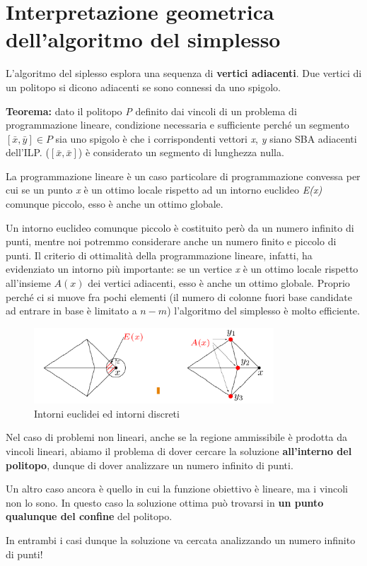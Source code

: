\documentclass[11pt]{book}
\begin{document}
\section{Interpretazione geometrica dell'algoritmo del simplesso}

L'algoritmo del siplesso esplora una sequenza di {\bf vertici
  adiacenti}. Due vertici di un politopo si dicono adiacenti se sono
connessi da uno spigolo.

{\bf Teorema:} dato il politopo {\em P} definito dai vincoli di un
problema di programmazione lineare, condizione necessaria e
sufficiente perch\'e un segmento $[\bar{x},\bar{y}] \in P$ sia uno
spigolo \`e che i corrispondenti vettori {\em x}, {\em y} siano SBA
adiacenti dell'ILP. ($[\bar{x},\bar{x}]$) \`e considerato un segmento
di lunghezza nulla.

La programmazione lineare \`e un caso particolare di programmazione
convessa per cui se un punto {\em x} \`e un ottimo locale rispetto ad
un intorno euclideo {\em E(x)} comunque piccolo, esso \`e anche un
ottimo globale.

Un intorno euclideo comunque piccolo \`e costituito per\`o da un
numero infinito di punti, mentre noi potremmo considerare anche un
numero finito e piccolo di punti. Il criterio di ottimalit\`a della
programmazione lineare, infatti, ha evidenziato un intorno pi\`u
importante: se un vertice {\em x} \`e un ottimo locale rispetto
all'insieme $A(x)$ dei vertici adiacenti, esso \`e anche un ottimo
globale. Proprio perch\'e ci si muove fra pochi elementi (il numero di
colonne fuori base candidate ad entrare in base \`e limitato a $n-m$)
l'algoritmo del simplesso \`e molto efficiente.

\begin{figure}[h!]
  \centering
  \includegraphics[width=0.8\textwidth]{images/cap4fig42.png}
  \caption{Intorni euclidei ed intorni discreti}
  \label{cap4fig42}
\end{figure}

Nel caso di problemi non lineari, anche se la regione ammissibile \`e
prodotta da vincoli lineari, abiamo il problema di dover cercare la
soluzione {\bf all'interno del politopo}, dunque di dover analizzare
un numero infinito di punti. 

Un altro caso ancora \`e quello in cui la funzione obiettivo \`e
lineare, ma i vincoli non lo sono. In questo caso la soluzione ottima
pu\`o trovarsi in {\bf un punto qualunque del confine} del politopo.

In entrambi i casi dunque la soluzione va cercata analizzando un
numero infinito di punti!
\end{document}
